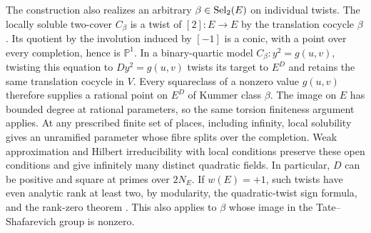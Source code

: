 \documentclass[11pt]{article}
\begin{document}
The construction also realizes an arbitrary $\beta\in\operatorname{Sel}_2(E)$ on individual twists. The locally soluble two-cover $C_\beta$ is a twist of $[2]:E\to E$ by the translation cocycle $\beta$. Its quotient by the involution induced by $[-1]$ is a conic, with a point over every completion, hence is $\mathbb P^1$. In a binary-quartic model $C_\beta:y^2=g(u,v)$, twisting this equation to $D y^2=g(u,v)$ twists its target to $E^D$ and retains the same translation cocycle in $V$. Every squareclass of a nonzero value $g(u,v)$ therefore supplies a rational point on $E^D$ of Kummer class $\beta$. The image on $E$ has bounded degree at rational parameters, so the same torsion finiteness argument applies. At any prescribed finite set of places, including infinity, local solubility gives an unramified parameter whose fibre splits over the completion. Weak approximation and Hilbert irreducibility with local conditions preserve these open conditions and give infinitely many distinct quadratic fields. In particular, $D$ can be positive and square at primes over $2N_E$. If $w(E)=+1$, such twists have even analytic rank at least two, by modularity, the quadratic-twist sign formula, and the rank-zero theorem \cite{wiles}. This also applies to $\beta$ whose image in the Tate--Shafarevich group is nonzero.
\end{document}
